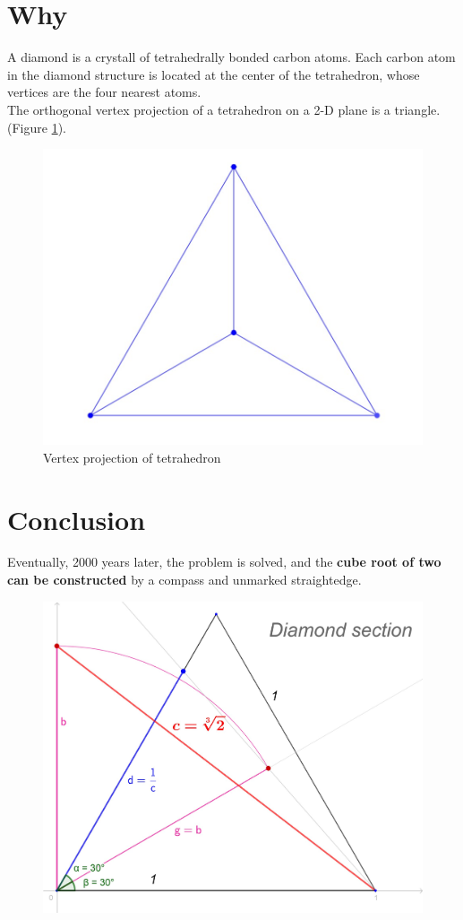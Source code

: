 \documentclass[12pt, letterpaper, oneside]{report}
\begin{document}
\section {Why}
A diamond is a crystall of tetrahedrally bonded carbon atoms.
Each carbon atom in the diamond structure is located at the center of the tetrahedron, whose vertices are the four nearest atoms.\cite{B}
\\
The orthogonal vertex projection of a tetrahedron on a 2-D plane is a triangle. (Figure \ref{fig:tetrahedron}).
\begin{figure}[h]
	\centering
	\includegraphics[width=0.3\linewidth]{tetrahedron}
	\caption{Vertex projection of tetrahedron}
	\label{fig:tetrahedron}
\end{figure}


\section{Conclusion}
\begin{center}
	Eventually, 2000 years later, the problem is solved, and the \textbf{cube root of two} \textbf{can be constructed} by a compass and unmarked straightedge.
\end{center}



\begin{figure}[h]
	\centering
	\includegraphics[width=0.6\linewidth]{ds_def.jpg}
	
	\label{fig:Diamond Section}
\end{figure}
\end{document}
